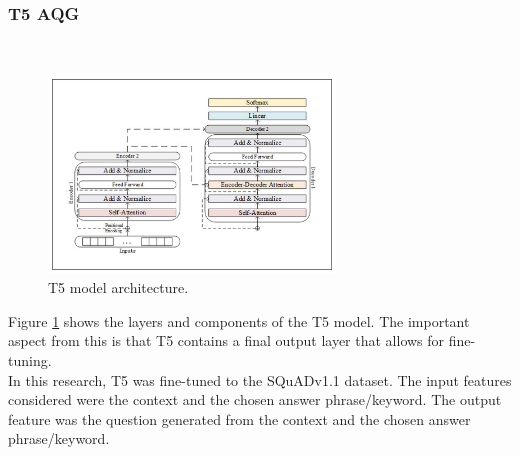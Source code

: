 \documentclass[conference]{IEEEtran}
\begin{document}
        \subsubsection{T5 AQG}
            \hfill \\
            \vspace{-0.5cm}
            \begin{figure}[H]
                \centerline{\includegraphics[width=3in]{t5arch.png}}
                \vspace{-0.4cm}
                \caption{T5 model architecture.} 
                \label{t5architecture}
            \end{figure}
            \vspace{-0.4cm}
            \indent Figure \ref{t5architecture} shows the 
            layers and components of the T5 model. 
            The important aspect from this is that T5 
            contains a final output layer that allows 
            for fine-tuning. \\ 
            \indent In this research, T5 was fine-tuned 
            to the SQuADv1.1 dataset. The input features 
            considered were the context and the chosen 
            answer phrase/keyword. The output feature
            was the question generated from the context
            and the chosen answer phrase/keyword. 
            
\end{document}

